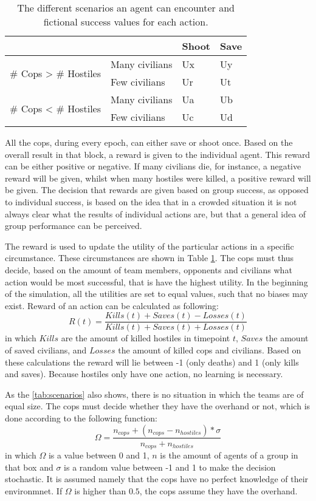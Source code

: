 \begin{table}[!ht]
\begin{center}
\begin{tabular}{l l | l l}
\hline
 & & Shoot & Save \\
\hline
\multirow{2}{*}{\# Cops > \# Hostiles} & Many civilians & Ux & Uy \\
 & Few civilians & Ur & Ut \\
\hline
\multirow{2}{*}{\# Cops < \# Hostiles} & Many civilians & Ua & Ub\\
 & Few civilians & Uc & Ud\\
\hline
\end{tabular}
\caption{The different scenarios an agent can encounter and fictional success values for each action.}
\label{tab:scenarios}
\end{center}
\end{table}
All the cops, during every epoch, can either save or shoot once. Based on the overall result in that block, a reward is given to the individual agent. This reward can be either positive or negative. If many civilians die, for instance, a negative reward will be given, whilst when many hostiles were killed, a positive reward will be given. The decision that rewards are given based on group success, as opposed to individual success, is based on the idea that in a crowded situation it is not always clear what the results of individual actions are, but that a general idea of group performance can be perceived. 

The reward is used to update the utility of the particular actions in a specific circumstance. These circumstances are shown in Table \ref{tab:scenarios}. The cops must thus decide, based on the amount of team members, opponents and civilians what action would be most successful, that is have the highest utility. In the beginning of the simulation, all the utilities are set to equal values, such that no biases may exist. Reward of an action can be calculated as following: 
$$ R(t) = \frac{Kills(t) + Saves(t) - Losses(t)}{Kills(t) + Saves(t) + Losses(t)}$$
in which $Kills$ are the amount of killed hostiles in timepoint $t$, $Saves$ the amount of saved civilians, and $Losses$ the amount of killed cops and civilians. Based on these calculations the reward will lie between -1 (only deaths) and 1 (only kills and saves). Because hostiles only have one action, no learning is necessary. 

As the \autoref{tab:scenarios} also shows, there is no situation in which the teams are of equal size. The cops must decide whether they have the overhand or not, which is done according to the following function:
$$ \Omega = \frac{n_{cops} + (n_{cops}-n_{hostiles})*\sigma}{n_{cops} + n_{hostiles}} $$
in which $\Omega$ is a value between 0 and 1, $n$ is the amount of agents of a group in that box and $\sigma$ is a random value between -1 and 1 to make the decision stochastic. It is assumed namely that the cops have no perfect knowledge of their environmnet. If $\Omega$ is higher than $0.5$, the cops assume they have the overhand.

